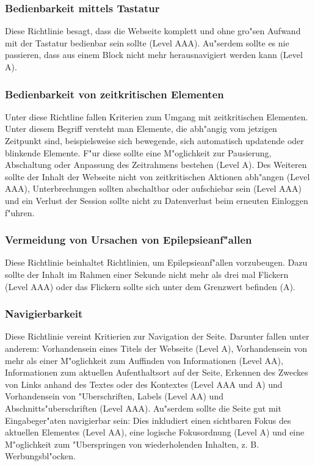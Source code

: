 \documentclass[a4paper,bibtotoc,oneside]{scrbook}
\begin{document}
\subsubsection{Bedienbarkeit mittels Tastatur}
Diese Richtlinie besagt, dass die Webseite komplett und ohne gro"sen Aufwand mit der Tastatur bedienbar sein sollte (Level AAA). Au"serdem sollte es nie passieren, dass aus einem Block nicht mehr herausnavigiert werden kann (Level A). \cite[Abschnitt 2.1]{wcag2}

\subsubsection{Bedienbarkeit von zeitkritischen Elementen}
Unter diese Richtline fallen Kriterien zum Umgang mit zeitkritischen Elementen. Unter diesem Begriff versteht man Elemente, die abh"angig vom jetzigen Zeitpunkt sind, beispielsweise sich bewegende, sich automatisch updatende oder blinkende Elemente. F"ur diese sollte eine M"oglichkeit zur Pausierung, Abschaltung oder Anpassung des Zeitrahmens bestehen (Level A). Des Weiteren sollte der Inhalt der Webseite nicht von zeitkritischen Aktionen abh"angen (Level AAA), Unterbrechungen sollten abschaltbar oder aufschiebar sein (Level AAA) und ein Verlust der Session sollte nicht zu Datenverlust beim erneuten Einloggen f"uhren. \cite[Abschnitt 2.2]{wcag2}

\subsubsection{Vermeidung von Ursachen von Epilepsieanf"allen}
Diese Richtlinie beinhaltet Richtlinien, um Epilepsieanf"allen vorzubeugen. Dazu sollte der Inhalt im Rahmen einer Sekunde nicht mehr als drei mal Flickern (Level AAA) oder das Flickern sollte sich unter dem Grenzwert befinden (A). \cite[Abschnitt 2.3]{wcag2}

\subsubsection{Navigierbarkeit}
Diese Richtlinie vereint Kritierien zur Navigation der Seite. Darunter fallen unter anderem: Vorhandensein eines Titels der Webseite (Level A), Vorhandensein von mehr als einer M"oglichkeit zum Auffinden von Informationen (Level AA), Informationen zum aktuellen Aufenthaltsort auf der Seite, Erkennen des Zweckes von Links anhand des Textes oder des Kontextes (Level AAA und A) und Vorhandensein von "Uberschriften, Labels (Level AA) und Abschnitts"uberschriften (Level AAA). Au"serdem sollte die Seite gut mit Eingabeger"aten navigierbar sein: Dies inkludiert einen sichtbaren Fokus des aktuellen Elementes (Level AA), eine logische Fokusordnung (Level A) und eine M"oglichkeit zum "Uberspringen von wiederholenden Inhalten, z. B. Werbungsbl"ocken. \cite[Abschnitt 2.4]{wcag2}
\end{document}

